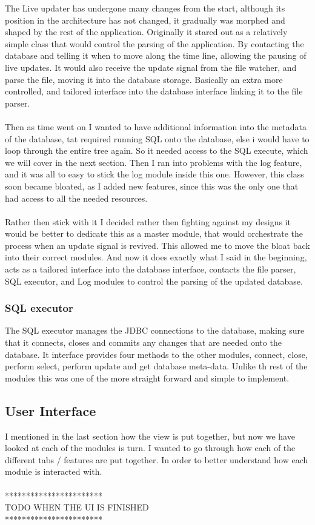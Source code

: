 The Live updater has undergone many changes from the start, although its position in the architecture has not changed, it gradually was morphed and shaped by the rest of the application. Originally it stared out as a relatively simple class that would control the parsing of the application. By contacting the database and telling it when to move along the time line, allowing the pausing of live updates. It would also receive the update signal from the file watcher, and parse the file, moving it into the database storage. Basically an extra more controlled, and tailored interface into the database interface linking it to the file parser.
\\\\
Then as time went on I wanted to have additional information into the metadata of the database, tat required running SQL onto the database, else i would have to loop through the entire tree again. So it needed access to the SQL execute, which we will cover in the next section. Then I ran into problems with the log feature, and it was all to easy to stick the log module inside this one. However, this class soon became bloated, as I added new features, since this was the only one that had access to all the needed resources.
\\\\
Rather then stick with it I decided rather then fighting against my designs it would be better to dedicate this as a master module, that would orchestrate the process when an update signal is revived. This allowed me to move the bloat back into their correct modules. And now it does exactly what I said in the beginning, acts as a tailored interface into the database interface, contacts the file parser, SQL executor, and Log modules to control the parsing of the updated database.

\subsubsection{SQL executor}
\label{subsubsec:sql_executor_imp}

The SQL executor manages the JDBC connections to the database, making sure that it connects, closes and commits any changes that are needed onto the database. It interface provides four methods to the other modules, connect, close, perform select, perform update and get database meta-data. Unlike th rest of the modules this was one of the more straight forward and simple to implement.

\subsection{User Interface}
\label{subsec:user_interface_imp}

I mentioned in the last section how the view is put together, but now we have looked at each of the modules is turn. I wanted to go through how each of the different tabs / features are put together. In order to better understand how each module is interacted with.
\\\\
***********************\\
TODO WHEN THE UI IS FINISHED\\
***********************